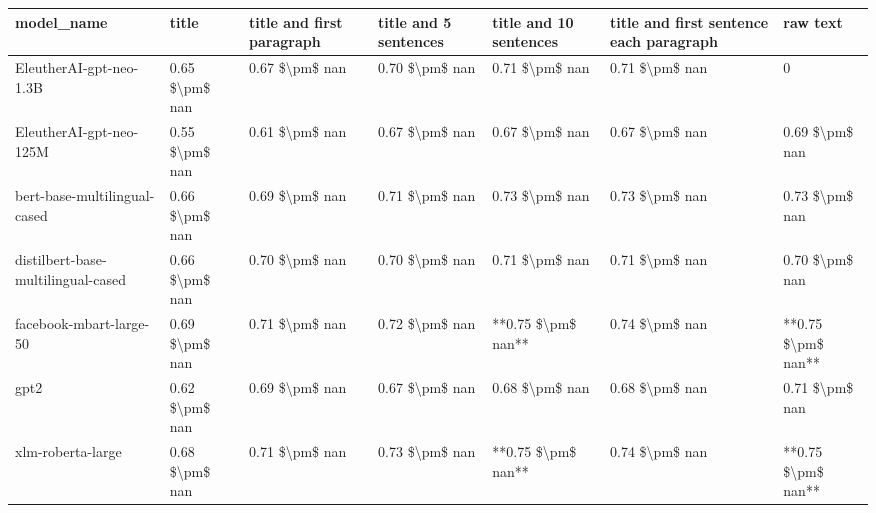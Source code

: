 \begin{tabular}{lllllll}
\toprule
                        model\_name &          title & title and first paragraph & title and 5 sentences & title and 10 sentences & title and first sentence each paragraph &           raw text \\
\midrule
           EleutherAI-gpt-neo-1.3B & 0.65 \$\textbackslash pm\$ nan &            0.67 \$\textbackslash pm\$ nan &        0.70 \$\textbackslash pm\$ nan &         0.71 \$\textbackslash pm\$ nan &                          0.71 \$\textbackslash pm\$ nan &                  0 \\
           EleutherAI-gpt-neo-125M & 0.55 \$\textbackslash pm\$ nan &            0.61 \$\textbackslash pm\$ nan &        0.67 \$\textbackslash pm\$ nan &         0.67 \$\textbackslash pm\$ nan &                          0.67 \$\textbackslash pm\$ nan &     0.69 \$\textbackslash pm\$ nan \\
      bert-base-multilingual-cased & 0.66 \$\textbackslash pm\$ nan &            0.69 \$\textbackslash pm\$ nan &        0.71 \$\textbackslash pm\$ nan &         0.73 \$\textbackslash pm\$ nan &                          0.73 \$\textbackslash pm\$ nan &     0.73 \$\textbackslash pm\$ nan \\
distilbert-base-multilingual-cased & 0.66 \$\textbackslash pm\$ nan &            0.70 \$\textbackslash pm\$ nan &        0.70 \$\textbackslash pm\$ nan &         0.71 \$\textbackslash pm\$ nan &                          0.71 \$\textbackslash pm\$ nan &     0.70 \$\textbackslash pm\$ nan \\
           facebook-mbart-large-50 & 0.69 \$\textbackslash pm\$ nan &            0.71 \$\textbackslash pm\$ nan &        0.72 \$\textbackslash pm\$ nan &     **0.75 \$\textbackslash pm\$ nan** &                          0.74 \$\textbackslash pm\$ nan & **0.75 \$\textbackslash pm\$ nan** \\
                              gpt2 & 0.62 \$\textbackslash pm\$ nan &            0.69 \$\textbackslash pm\$ nan &        0.67 \$\textbackslash pm\$ nan &         0.68 \$\textbackslash pm\$ nan &                          0.68 \$\textbackslash pm\$ nan &     0.71 \$\textbackslash pm\$ nan \\
                 xlm-roberta-large & 0.68 \$\textbackslash pm\$ nan &            0.71 \$\textbackslash pm\$ nan &        0.73 \$\textbackslash pm\$ nan &     **0.75 \$\textbackslash pm\$ nan** &                          0.74 \$\textbackslash pm\$ nan & **0.75 \$\textbackslash pm\$ nan** \\
\bottomrule
\end{tabular}
